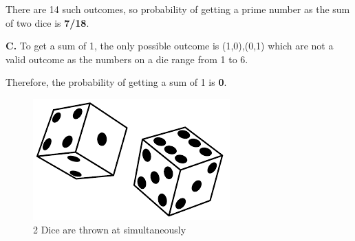 \documentclass{IEEEtran}
\begin{document}
\bigskip

There are 14 such outcomes, so probability of getting a prime number as the sum of two dice is \textbf{7/18}.

\bigskip

\textbf{C.}
To get a sum of 1, the only possible outcome is (1,0),(0,1) which are not a valid outcome as the numbers on a die range from 1 to 6. \newline

\bigskip

Therefore, the probability of getting a sum of 1 is \textbf{0}.


\begin{figure}[!ht]
    \center
    \includegraphics[width=0.6\linewidth]{figs/dice.png}
    \caption{\label{schema}2 Dice are thrown at simultaneously}
  \end{figure}



		

\end{document}

